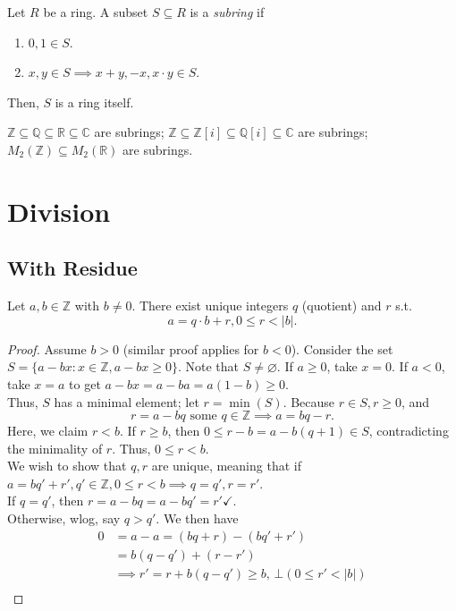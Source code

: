 \documentclass[12pt,oneside]{article}
\begin{document}
\begin{definition}[Subring]
  Let $R$ be a ring. A subset $S \subseteq R$ is a \emph{subring} if \begin{enumerate}
    \item $0,1 \in S$.
    \item $x,y \in S \implies x + y, -x, x \cdot y \in S$.
  \end{enumerate}
  Then, $S$ is a ring itself.

  $\mathbb{Z} \subseteq \mathbb{Q} \subseteq \mathbb{R} \subseteq \mathbb{C}$ are subrings; $\mathbb{Z} \subseteq \mathbb{Z}[i] \subseteq \mathbb{Q}[i] \subseteq \mathbb{C}$ are subrings; $M_2 (\mathbb{Z}) \subseteq M_2(\mathbb{R})$ are subrings.
\end{definition}

\newpage

\section{Division}
\subsection{With Residue}
\begin{theorem}
  Let $a,b \in \mathbb{Z}$ with $b\neq 0$. There exist unique integers $q$ (quotient) and $r$ s.t.\[a = q \cdot b + r, 0 \leq r < |b|.\]
\end{theorem}

\begin{proof}
  Assume $b>0$ (similar proof applies for $b < 0$). Consider the set $S = \{a - bx: x\in \mathbb{Z}, a - bx \geq 0\}.$ Note that $S \neq \varnothing$. If $a \geq 0$, take $x = 0$. If $a < 0$, take $x = a$ to get $a-bx=a-ba=a(1-b) \geq 0$.\\
  Thus, $S$ has a minimal element; let $r = \min(S)$. Because $r \in S, r \geq 0$, and \[r = a-bq \text{ some } q \in \mathbb{Z} \implies a= bq - r.\] Here, we claim $r < b$. If $r \geq b$, then $0 \leq r - b = a - b(q+1) \in S$, contradicting the minimality of $r$. Thus, $0 \leq r < b$.\\
  We wish to show that $q, r$ are unique, meaning that if $a = bq' + r', q' \in \mathbb{Z}, 0 \leq r < b \implies q = q', r=r'$.\\
  If $q = q'$, then $r = a -b q = a - bq' = r' \checkmark$.\\
  Otherwise, wlog, say $q > q'$. We then have \begin{align*}
    0 &= a - a = (bq +r) - (bq' + r')\\
    &= b(q-q') + (r-r')\\
    &\implies r' = r + b(q-q') \geq b,\,\bot (0 \leq r' < |b|)\\
  \end{align*}
\end{proof}
\end{document}
